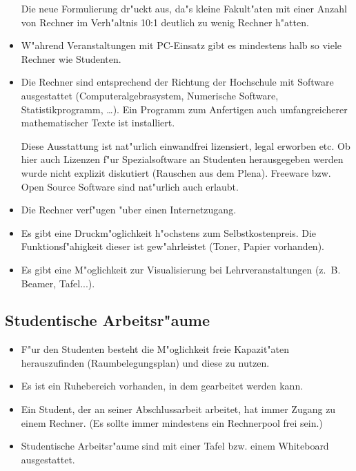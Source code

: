 \begin{itemize}
\begin{kcmt}
\begin{komacmt}
	Die neue Formulierung dr"uckt aus, da"s kleine Fakult"aten mit einer Anzahl von
	Rechner im Verh"altnis 10:1 deutlich zu wenig Rechner h"atten.
\end{komacmt}\end{kcmt}
	\item W"ahrend Veranstaltungen mit PC-Einsatz gibt es mindestens halb so viele Rechner wie Studenten.
	\item Die Rechner sind entsprechend der Richtung der Hochschule mit Software 
		ausgestattet (Computeralgebrasystem, Numerische Software, Statistikprogramm, \dots). 
		Ein Programm zum Anfertigen auch umfangreicherer mathematischer Texte ist installiert.
\begin{kcmt}\begin{komacmt}
	Diese Ausstattung ist nat"urlich einwandfrei lizensiert, legal erworben etc.
	Ob hier auch Lizenzen f"ur Spezialsoftware an Studenten herausgegeben werden
	wurde nicht explizit diskutiert (Rauschen aus dem Plena).
	Freeware bzw. Open Source Software sind nat"urlich auch erlaubt.
\end{komacmt}\end{kcmt}
	\item Die Rechner verf"ugen "uber einen Internetzugang. 
	\item Es gibt eine Druckm"oglichkeit h"ochstens zum Selbstkostenpreis. 
		Die Funktionsf"ahigkeit dieser ist gew"ahrleistet (Toner, Papier vorhanden).
	\item Es gibt eine M"oglichkeit zur Visualisierung bei Lehrveranstaltungen (z.~B. Beamer, Tafel...).
\end{itemize}

\subsection{Studentische Arbeitsr"aume}
\begin{itemize}
	\item F"ur den Studenten besteht die M"oglichkeit freie Kapazit"aten herauszufinden 
		(Raumbelegungsplan) und diese zu nutzen. 
	\item Es ist ein Ruhebereich vorhanden, in dem gearbeitet werden kann.
	\item Ein Student, der an seiner Abschlussarbeit arbeitet, hat immer Zugang zu einem Rechner. 
		(Es sollte immer mindestens ein Rechnerpool frei sein.)
	\item Studentische Arbeitsr"aume sind mit einer Tafel bzw. einem Whiteboard ausgestattet.
\end{itemize}


